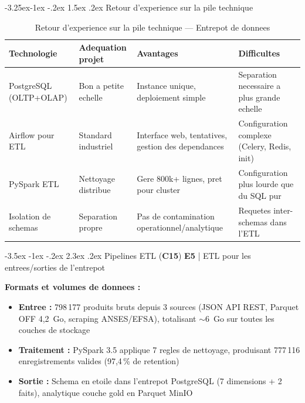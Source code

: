 \documentclass[a4paper,11pt,oneside,openany]{report}
\makeatletter
\renewcommand\section{\@startsection{section}{1}{\z@}%
  {-3.5ex \@plus -1ex \@minus -.2ex}%
  {2.3ex \@plus.2ex}%
  {\normalfont\Large\bfseries\color{ntgreen}}}
\renewcommand\subsection{\@startsection{subsection}{2}{\z@}%
  {-3.25ex\@plus -1ex \@minus -.2ex}%
  {1.5ex \@plus .2ex}%
  {\normalfont\large\bfseries\color{ntdarkgreen}}}
\newcommand{\competence}[1]{\textbf{\textcolor{ntgreen}{#1}}}
\newcommand{\evaluation}[1]{\textbf{\textcolor{ntblue}{#1}}}
\makeatother
\begin{document}
\subsection{Retour d'experience sur la pile technique}

\begin{table}[H]
\centering
\caption{Retour d'experience sur la pile technique --- Entrepot de donnees}
\label{tab:tech-feedback}
\begin{tabularx}{\textwidth}{L{2.8cm} L{3cm} L{3.5cm} L{3.5cm}}
\toprule
\textbf{Technologie} & \textbf{Adequation projet} & \textbf{Avantages} & \textbf{Difficultes} \\
\midrule
PostgreSQL (OLTP+OLAP) & Bon a petite echelle & Instance unique, deploiement simple & Separation necessaire a plus grande echelle \\
Airflow pour ETL & Standard industriel & Interface web, tentatives, gestion des dependances & Configuration complexe (Celery, Redis, init) \\
PySpark ETL & Nettoyage distribue & Gere 800k+ lignes, pret pour cluster & Configuration plus lourde que du SQL pur \\
Isolation de schemas & Separation propre & Pas de contamination operationnel/analytique & Requetes inter-schemas dans l'ETL \\
\bottomrule
\end{tabularx}
\end{table}


\section{Pipelines ETL (\competence{C15})}
\label{sec:c15}
{\small\evaluation{E5} | ETL pour les entrees/sorties de l'entrepot}

\textbf{Formats et volumes de donnees :}
\begin{itemize}[nosep]
  \item \textbf{Entree :} 798\,177 produits bruts depuis 3 sources (JSON API
        REST, Parquet OFF 4,2~Go, scraping ANSES/EFSA), totalisant $\sim$6~Go
        sur toutes les couches de stockage
  \item \textbf{Traitement :} PySpark 3.5 applique 7 regles de nettoyage,
        produisant 777\,116 enregistrements valides (97,4\,\% de retention)
  \item \textbf{Sortie :} Schema en etoile dans l'entrepot PostgreSQL
        (7 dimensions + 2 faits), analytique couche gold en Parquet MinIO
\end{itemize}
\end{document}
